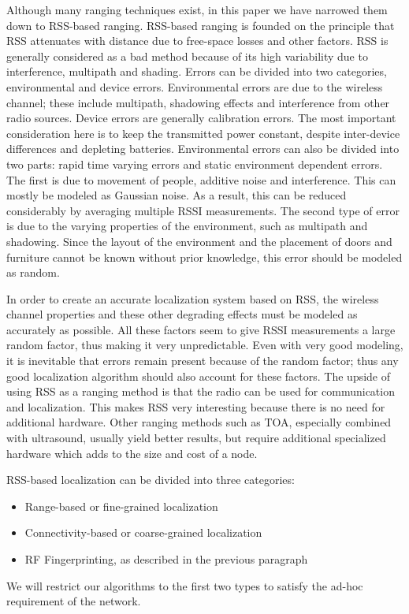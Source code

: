 Although many ranging techniques exist, in this paper we have narrowed them down to RSS-based ranging. 
RSS-based ranging is founded on the principle that RSS attenuates with distance due to free-space losses and other factors. RSS is generally considered as a bad method because of its high variability due to interference, multipath and shading. Errors can be divided into two categories, environmental and device errors. Environmental errors are due to the wireless channel; these include multipath, shadowing effects and interference from other radio sources. Device errors are generally calibration errors. The most important consideration here is to keep the transmitted power constant, despite inter-device differences and depleting batteries. Environmental errors can also be divided into two parts: rapid time varying errors and static environment dependent errors. The first is due to movement of people, additive noise and interference. This can mostly be modeled as Gaussian noise. As a result, this can be reduced considerably by averaging multiple RSSI measurements. The second type of error is due to the varying properties of the environment, such as multipath and shadowing. Since the layout of the environment and the placement of doors and furniture cannot be known without prior knowledge, this error should be modeled as random. 

In order to create an accurate localization system based on RSS, the wireless channel properties and these other degrading effects must be modeled as accurately as possible. All these factors seem to give RSSI measurements a large random factor, thus making it very unpredictable. Even with very good modeling, it is inevitable that errors remain present because of the random factor; thus any good localization algorithm should also account for these factors. The upside of using RSS as a ranging method is that the radio can be used for communication and localization. This makes RSS very interesting because there is no need for additional hardware. Other ranging methods such as TOA, especially combined with ultrasound, usually yield better results, but require additional specialized hardware which adds to the size and cost of a node.

RSS-based localization can be divided into three categories:
\begin{itemize}
	\item Range-based or fine-grained localization 
	\item Connectivity-based or coarse-grained localization 
	\item RF Fingerprinting, as described in the previous paragraph
\end{itemize}
We will restrict our algorithms to the first two types to satisfy the ad-hoc requirement of the network. 

